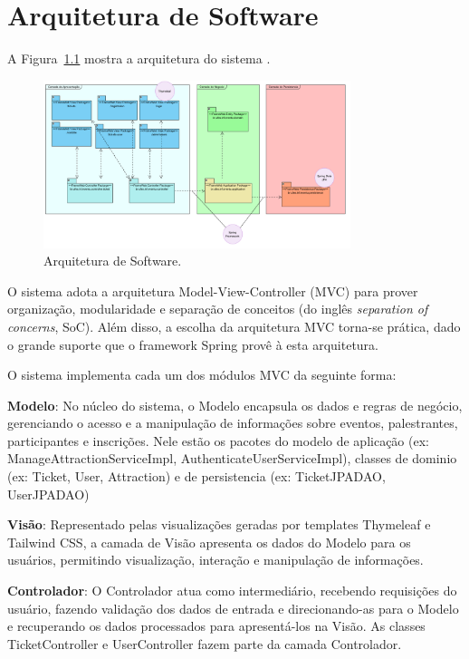 
\chapter{Arquitetura de Software}
\label{sec-arquitetura}
\vspace{-1cm}

A Figura~\ref{figura-arquitetura} mostra a arquitetura do sistema \emph{\imprimirtitulo}.

\begin{figure}[h]
	\centering
	\includegraphics[width=0.8\textwidth]{figuras/Arquitetura.PNG}
	\caption{Arquitetura de Software.}
	\label{figura-arquitetura}
\end{figure}

O sistema \emph{\imprimirtitulo} adota a arquitetura Model-View-Controller (MVC)\cite{fowler:book02} para prover organização, modularidade e separação de conceitos (do inglês \textit{separation of concerns}, SoC). Além disso, a escolha da arquitetura MVC torna-se prática, dado o grande suporte que o framework Spring provê à esta arquitetura.

O sistema \emph{\imprimirtitulo} implementa cada um dos módulos MVC da seguinte forma:

\textbf{Modelo}: No núcleo do sistema, o Modelo encapsula os dados e regras de negócio, gerenciando o acesso e a manipulação de informações sobre eventos, palestrantes, participantes e inscrições. Nele estão os pacotes do modelo de aplicação (ex: ManageAttractionServiceImpl, AuthenticateUserServiceImpl), classes de dominio (ex: Ticket, User, Attraction) e de persistencia (ex: TicketJPADAO, UserJPADAO)

\textbf{Visão}: Representado pelas visualizações geradas por templates Thymeleaf e Tailwind CSS, a camada de Visão apresenta os dados do Modelo para os usuários, permitindo visualização, interação e manipulação de informações.

\textbf{Controlador}: O Controlador atua como intermediário, recebendo requisições do usuário, fazendo validação dos dados de entrada e direcionando-as para o Modelo e recuperando os dados processados para apresentá-los na Visão. As classes TicketController e UserController fazem parte da camada Controlador.